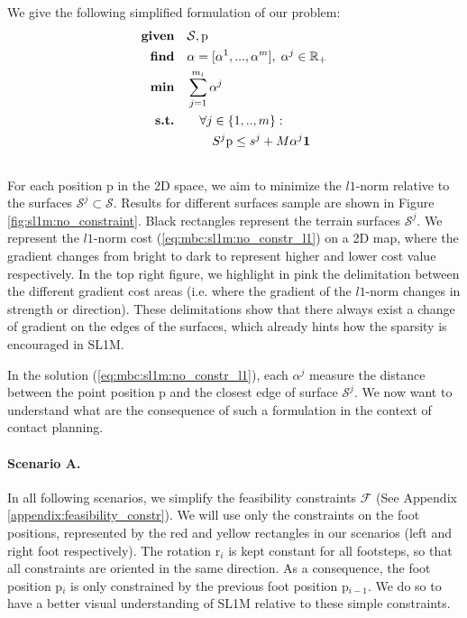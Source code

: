 We give the following simplified formulation of our problem:
\begin{align}
    \textrm{\textbf{given}} \quad & \mathcal{S}, \mbox{p} \nonumber\\
    \textrm{\textbf{find}}  \quad & \alpha=[\alpha^1,...,\alpha^m],\; \alpha^j \in \mathbb{R}_{+} \nonumber\\
    \textrm{\textbf{min}}  \quad & \sum_{j=1}^{m_i} \alpha^j \label{eq:mbc:sl1m:no_constr_l1}\\
    \textrm{\textbf{s.t.}}  \quad & \quad \forall j \in \{1,..,m\} : \nonumber\\
                            \quad & \quad \quad S^j \mbox{p} \leq s^j + M \alpha^j \textbf{1} \nonumber\\
                            \nonumber
\end{align}
For each position p in the 2D space, we aim to minimize the $l1$-norm relative to the surfaces $\mathcal{S}^j \subset \mathcal{S}$. 
Results for different surfaces sample are shown in Figure \ref{fig:sl1m:no_constraint}.
Black rectangles represent the terrain surfaces $\mathcal{S}^j$.
We represent the $l1$-norm cost (\ref{eq:mbc:sl1m:no_constr_l1}) on a 2D map, where the gradient changes from bright to dark to represent higher and lower cost value respectively.
In the top right figure, we highlight in pink the delimitation between the different gradient cost areas (i.e. where the gradient of the $l1$-norm changes in strength or direction).
These delimitations show that there always exist a change of gradient on the edges of the surfaces, which already hints how the sparsity is encouraged in SL1M.

In the solution (\ref{eq:mbc:sl1m:no_constr_l1}), each $\alpha^j$ measure the distance between the point position p and the closest edge of surface $\mathcal{S}^j$.
We now want to understand what are the consequence of such a formulation in the context of contact planning.


\paragraph{Scenario A.}

In all following scenarios, we simplify the feasibility constraints $\mathcal{F}$ (See Appendix \ref{appendix:feasibility_constr}).
We will use only the constraints on the foot positions, represented by the red and yellow rectangles in our scenarios (left and right foot respectively).
The rotation r$_i$ is kept constant for all footsteps, so that all constraints are oriented in the same direction.
As a consequence, the foot position p$_i$ is only constrained by the previous foot position p$_{i-1}$.
We do so to have a better visual understanding of SL1M relative to these simple constraints.

